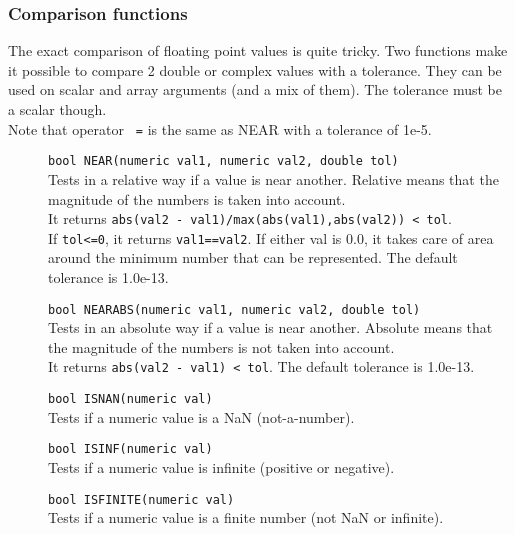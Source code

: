 \subsubsection{\label{TAQL:COMPARISONFUNCTIONS}Comparison functions}
The exact comparison of floating point values is quite tricky.
Two functions make it possible to compare 2 double or complex
values with a tolerance.
They can be used on scalar and array arguments (and a mix of them).
The tolerance must be a scalar though.
\\Note that operator \texttt{~=} is the same as NEAR with a tolerance of 1e-5.
\begin{description}
  \item[] \texttt{bool NEAR(numeric val1, numeric val2, double tol)}\\
    Tests in a relative way if a value is near another. Relative
    means that the
    magnitude of the numbers is taken into account.
    \\It returns
    \texttt{abs(val2 - val1)/max(abs(val1),abs(val2)) < tol}.
    \\If \texttt{tol<=0}, it returns \texttt{val1==val2}.
    If either val is 0.0, it takes
    care of area around the minimum number that can be represented.
    The default tolerance is 1.0e-13.
  \item[] \texttt{bool NEARABS(numeric val1, numeric val2, double tol)}\\
    Tests in an absolute way if a value is near another. Absolute
    means that the
    magnitude of the numbers is not taken into account.
    \\It returns \texttt{abs(val2 - val1) < tol}.
    The default tolerance is 1.0e-13.
  \item[] \texttt{bool ISNAN(numeric val)}\\
    Tests if a numeric value is a NaN (not-a-number).
  \item[] \texttt{bool ISINF(numeric val)}\\
    Tests if a numeric value is infinite (positive or negative).
  \item[] \texttt{bool ISFINITE(numeric val)}\\
    Tests if a numeric value is a finite number (not NaN or infinite).
\end{description}

